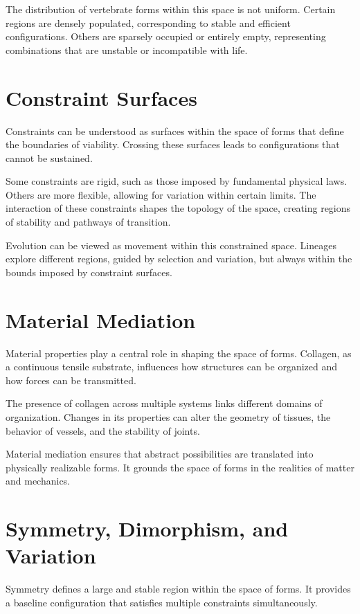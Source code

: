 \documentclass[11pt,oneside]{book}
\begin{document}
The distribution of vertebrate forms within this space is not uniform. Certain regions are densely populated, corresponding to stable and efficient configurations. Others are sparsely occupied or entirely empty, representing combinations that are unstable or incompatible with life.

\section{Constraint Surfaces}

Constraints can be understood as surfaces within the space of forms that define the boundaries of viability. Crossing these surfaces leads to configurations that cannot be sustained.

Some constraints are rigid, such as those imposed by fundamental physical laws. Others are more flexible, allowing for variation within certain limits. The interaction of these constraints shapes the topology of the space, creating regions of stability and pathways of transition.

Evolution can be viewed as movement within this constrained space. Lineages explore different regions, guided by selection and variation, but always within the bounds imposed by constraint surfaces.

\section{Material Mediation}

Material properties play a central role in shaping the space of forms. Collagen, as a continuous tensile substrate, influences how structures can be organized and how forces can be transmitted.

The presence of collagen across multiple systems links different domains of organization. Changes in its properties can alter the geometry of tissues, the behavior of vessels, and the stability of joints.

Material mediation ensures that abstract possibilities are translated into physically realizable forms. It grounds the space of forms in the realities of matter and mechanics.

\section{Symmetry, Dimorphism, and Variation}

Symmetry defines a large and stable region within the space of forms. It provides a baseline configuration that satisfies multiple constraints simultaneously.
\end{document}
